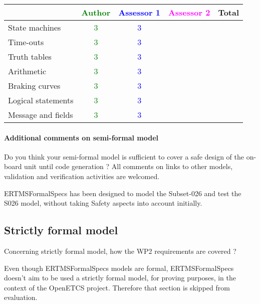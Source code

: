\begin{tabular}{|l | c | c | c | c|}
\hline
& \textcolor{green}{Author} & \textcolor{blue}{Assessor 1} & \textcolor{magenta}{Assessor 2} & Total \\
\hline 
State machines  & \textcolor{green}{3} & \textcolor{blue}{3} & &  \\
\hline
Time-outs  & \textcolor{green}{3} & \textcolor{blue}{3} & &  \\
\hline
Truth tables  & \textcolor{green}{3} & \textcolor{blue}{3} & &  \\
\hline
Arithmetic  & \textcolor{green}{3} & \textcolor{blue}{3} & &  \\
\hline
Braking curves  & \textcolor{green}{3} & \textcolor{blue}{3} & &  \\
\hline
Logical statements & \textcolor{green}{3} & \textcolor{blue}{3} & &  \\
\hline
Message and fields & \textcolor{green}{3} & \textcolor{blue}{3} & &  \\
\hline
\end{tabular}

\paragraph{Additional comments on semi-formal  model} Do you think your semi-formal  model is sufficient to cover a safe design of the on-board unit until code generation ?
All comments on links to  other models, validation and verification activities are welcomed.

\begin{author_comment}
ERTMSFormalSpecs has been designed to model the Subset-026 and test the S026 model, without taking Safety aspects into account initially.    
\end{author_comment}
\subsection{Strictly formal model}

Concerning strictly formal model, how the WP2 requirements are covered ?

\begin{author_comment}
Even though ERTMSFormalSpecs models are formal, ERTMSFormalSpecs doesn't aim to be used a strictly formal model, for proving purposes, in the context of the OpenETCS project. Therefore that section is skipped from evaluation.  
\end{author_comment}

